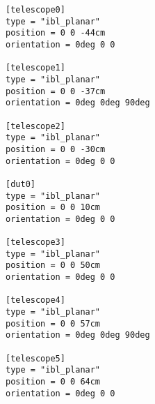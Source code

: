 \begin{lstlisting}[caption={Allpix$^2$ geometry file for all simulations}]
[telescope0]
type = "ibl_planar"
position = 0 0 -44cm
orientation = 0deg 0 0

[telescope1]
type = "ibl_planar"
position = 0 0 -37cm
orientation = 0deg 0deg 90deg

[telescope2]
type = "ibl_planar"
position = 0 0 -30cm
orientation = 0deg 0 0

[dut0]
type = "ibl_planar"
position = 0 0 10cm
orientation = 0deg 0 0

[telescope3]
type = "ibl_planar"
position = 0 0 50cm
orientation = 0deg 0 0

[telescope4]
type = "ibl_planar"
position = 0 0 57cm
orientation = 0deg 0deg 90deg

[telescope5]
type = "ibl_planar"
position = 0 0 64cm
orientation = 0deg 0 0
\end{lstlisting}
